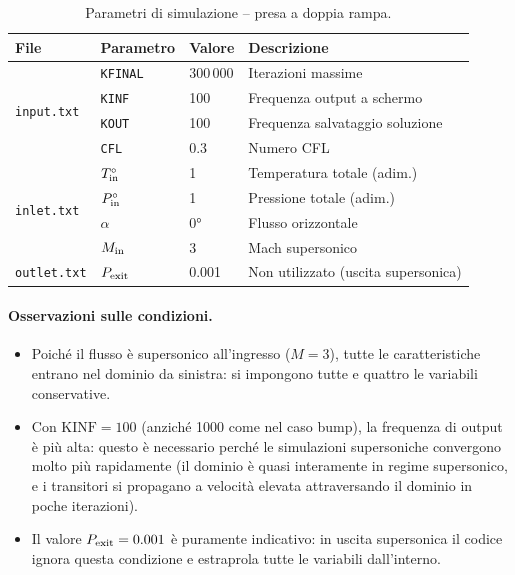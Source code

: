 \begin{table}[H]
  \centering
  \caption{Parametri di simulazione -- presa a doppia rampa.}
  \label{tab:presa_param}
  \begin{tabular}{llll}
    \toprule
    File & Parametro & Valore & Descrizione \\
    \midrule
    \multirow{4}{*}{\texttt{input.txt}}
      & \texttt{KFINAL} & 300\,000 & Iterazioni massime \\
      & \texttt{KINF}   & 100      & Frequenza output a schermo \\
      & \texttt{KOUT}   & 100      & Frequenza salvataggio soluzione \\
      & \texttt{CFL}    & 0.3      & Numero CFL \\
    \midrule
    \multirow{4}{*}{\texttt{inlet.txt}}
      & $T^\circ_{\rm in}$ & 1  & Temperatura totale (adim.) \\
      & $P^\circ_{\rm in}$ & 1  & Pressione totale (adim.) \\
      & $\alpha$           & 0° & Flusso orizzontale \\
      & $M_{\rm in}$       & 3  & Mach supersonico \\
    \midrule
    \texttt{outlet.txt}
      & $P_{\rm exit}$ & 0.001 & Non utilizzato (uscita supersonica) \\
    \bottomrule
  \end{tabular}
\end{table}

\paragraph{Osservazioni sulle condizioni.}
\begin{itemize}
  \item Poiché il flusso è supersonico all'ingresso ($M = 3$), tutte le caratteristiche
    entrano nel dominio da sinistra: si impongono tutte e quattro le variabili conservative.
  \item Con $\text{KINF} = 100$ (anziché 1000 come nel caso bump), la frequenza di output
    è più alta: questo è necessario perché le simulazioni supersoniche convergono molto più
    rapidamente (il dominio è quasi interamente in regime supersonico, e i transitori si
    propagano a velocità elevata attraversando il dominio in poche iterazioni).
  \item Il valore $P_{\rm exit} = 0.001$ è puramente indicativo: in uscita supersonica
    il codice ignora questa condizione e estraprola tutte le variabili dall'interno.
\end{itemize}

